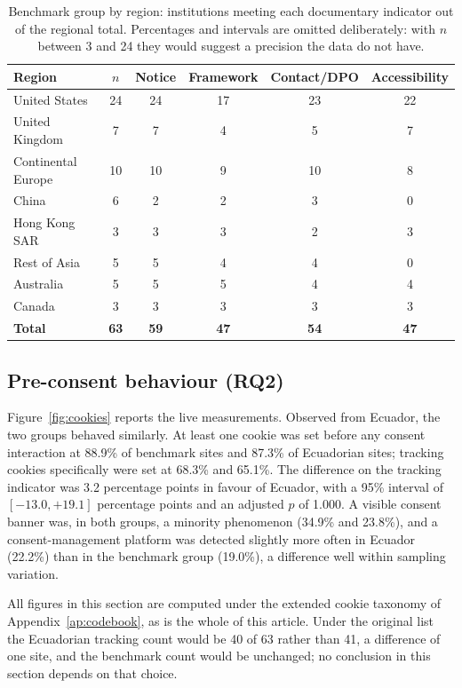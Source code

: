 \documentclass[pdflatex,sn-basic,Numbered,iicol]{sn-jnl}
\theoremstyle{thmstyleone}
\theoremstyle{thmstyletwo}
\theoremstyle{thmstylethree}
\begin{document}
\begin{table}[htbp]
	\centering
	\caption{Benchmark group by region: institutions meeting each documentary indicator out of the regional total. Percentages and intervals are omitted deliberately: with $n$ between 3 and 24 they would suggest a precision the data do not have.}\label{tab:reg}
	\small
	\begin{tabular}{@{}lccccc@{}}
		\toprule
		\textbf{Region} & \textbf{$n$} & \textbf{Notice} & \textbf{Framework} & \textbf{Contact/DPO} & \textbf{Accessibility} \\
		\midrule
		United States & 24 & 24 & 17 & 23 & 22 \\
		United Kingdom & 7 & 7 & 4 & 5 & 7 \\
		Continental Europe & 10 & 10 & 9 & 10 & 8 \\
		China & 6 & 2 & 2 & 3 & 0 \\
		Hong Kong SAR & 3 & 3 & 3 & 2 & 3 \\
		Rest of Asia & 5 & 5 & 4 & 4 & 0 \\
		Australia & 5 & 5 & 5 & 4 & 4 \\
		Canada & 3 & 3 & 3 & 3 & 3 \\
		\midrule
		\textbf{Total} & \textbf{63} & \textbf{59} & \textbf{47} & \textbf{54} & \textbf{47} \\
		\bottomrule
	\end{tabular}
\end{table}

\subsection{Pre-consent behaviour (RQ2)}\label{sec:results-cookies}

Figure~\ref{fig:cookies} reports the live measurements. Observed from Ecuador, the two groups behaved similarly. At least one cookie was set before any consent interaction at 88.9\% of benchmark sites and 87.3\% of Ecuadorian sites; tracking cookies specifically were set at 68.3\% and 65.1\%. The difference on the tracking indicator was 3.2 percentage points in favour of Ecuador, with a 95\% interval of $[-13.0, +19.1]$ percentage points and an adjusted $p$ of 1.000. A visible consent banner was, in both groups, a minority phenomenon (34.9\% and 23.8\%), and a consent-management platform was detected slightly more often in Ecuador (22.2\%) than in the benchmark group (19.0\%), a difference well within sampling variation.

All figures in this section are computed under the extended cookie taxonomy of Appendix~\ref{ap:codebook}, as is the whole of this article. Under the original list the Ecuadorian tracking count would be 40 of 63 rather than 41, a difference of one site, and the benchmark count would be unchanged; no conclusion in this section depends on that choice.
\end{document}
